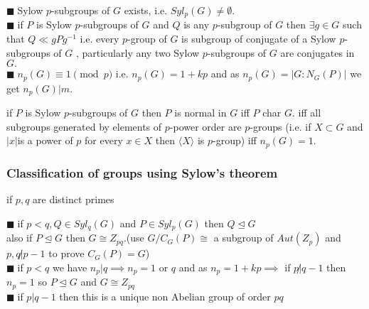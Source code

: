 \documentclass[11pt]{extarticle}
\newcommand{\y}{$\blacksquare\;$}
\newcommand{\tbx}[2][]{
	\begin{tcolorbox}[enhanced,breakable,size=small,colback=black!2!white,title={#1},arc is angular, arc=1.5mm,drop fuzzy shadow]
		#2
	\end{tcolorbox}
}
\begin{document}
\begin{multicols}{2}
{			\y  Sylow $ p $-subgroups of $ G $ exists, i.e. $ Syl_p(G)\neq \emptyset $. \\
			\y  if $ P $ is Sylow $ p $-subgroups of $ G $ and $ Q $ is any $ p $-subgroup of $ G $ then $ \exists g \in G $ such that $ Q\ll gPg^{-1} $ i.e. every $ p $-group of $ G $ is subgroup of conjugate of  a Sylow $ p $-subgroups of $ G $ , particularly any two Sylow $ p $-subgroups of $ G $ are conjugates in $ G. $ \\
			\y  $ n_p(G)\equiv 1 \pmod{p} $ i.e. $ n_p(G)=1+kp $ and as $ n_p(G)=|G:N_G(P)| $ we get $ n_p(G) | m .$ }
		
	\tbx[Consequences of of Sylow's Theorem ]{
		if $ P $ is Sylow $ p $-subgroups of $ G $ then $P$ is normal in $ G $ iff $ P $ char $ G .$ iff all subgroups generated by 
		elements of $ p $-power order are $ p $-groups  (i.e. if $ X\subset G $ and $ |x| $is a power of $ p $ for every 
		$ x\in X $ then $ \langle X \rangle $ is $ p $-group) iff $ n_p(G)=1. $}
	
	\subsubsection{ Classification of groups using Sylow's theorem}
	 if $ p,q $ are distinct primes
	\tbx[group $ G $ of order $ pq $ ]{
		
			\y   if $ p<q , Q\in Syl_q(G)$ and $ P\in Syl_p(G) $  then $ Q\trianglelefteq G $ \\ 
			also if $ P\trianglelefteq G $ then $ G\cong Z_{pq}.$(use $ G/C_G(P) \cong $ a subgroup of $ Aut(Z_p) $ and $ p,q\not| p-1 $ to prove $ C_G(P)=G $)	\\
			\y  if $ p<q $ we have $ n_p|q  \implies n_p=1 $ or $ q $  and as $ n_p=1+kp \implies $ if $ p\not| q-1 $ then $ n_p=1 $ so $ P\trianglelefteq G $ and $ G \cong Z_{pq} $  \\
			\y  if $ p|q-1 $ then this is a unique non Abelian group of order $ pq $ }
		

\end{multicols}
\end{document}
